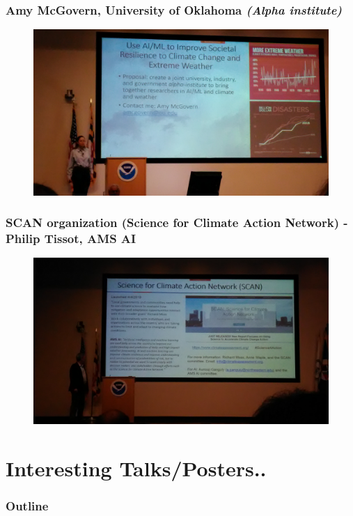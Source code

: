 \documentclass{beamer}
\begin{document}
\begin{frame}
\frametitle{Amy McGovern, University of Oklahoma \textit{(Alpha institute)}}
\begin{figure}
	\includegraphics[width=\linewidth]{figs/P_20190425_105024.jpg}
\end{figure}
\end{frame}

\begin{frame}
\frametitle{SCAN organization (Science for Climate Action Network) - Philip Tissot, AMS AI}
\begin{figure}
	\includegraphics[width=\linewidth]{figs/P_20190423_105212.jpg}
\end{figure}
\end{frame}

\section{Interesting Talks/Posters..}

\begin{frame}
\frametitle{Outline} %
\tableofcontents[currentsection] %
\end{frame}
%
\end{document}
